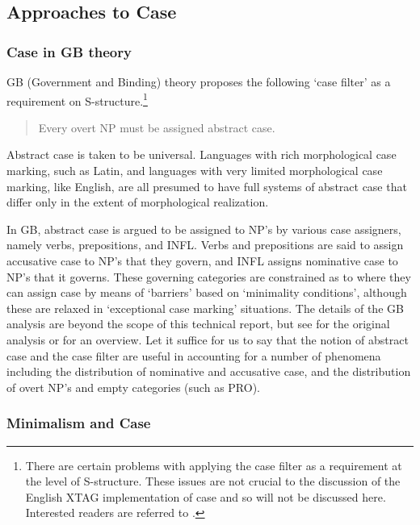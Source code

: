 \subsection{Approaches to Case}
\subsubsection{Case in GB theory}

GB (Government and Binding) theory proposes the following
`case filter' as a requirement on S-structure.\footnote{There are certain
problems with applying the case filter as a requirement at the level of
S-structure.  These issues are not crucial to the discussion of the English
XTAG implementation of case and so will not be discussed here.  Interested
readers are referred to
\cite{lasnik-uriagereka88}.}

\begin{verse}
Every overt NP must be assigned abstract case. \cite{haegeman91}
\end{verse}

Abstract case is taken to be universal.  Languages with rich morphological case
marking, such as Latin, and languages with very limited morphological case
marking, like English, are all presumed to have full systems of abstract case
that differ only in the extent of morphological realization.

In GB, abstract case is argued to be assigned to NP's by various case
assigners, namely verbs, prepositions, and INFL.  Verbs and
prepositions are said to assign accusative case to NP's that they
govern, and INFL assigns nominative case to NP's that it governs.
These governing categories are constrained as to where they can assign
case by means of `barriers' based on `minimality conditions', although
these are relaxed in `exceptional case marking' situations.  The
details of the GB analysis are beyond the scope of this technical
report, but see \cite{chomsky86} for the original analysis or
\cite{haegeman91} for an overview.  Let it suffice for us to say that
the notion of abstract case and the case filter are useful in
accounting for a number of phenomena including the distribution of
nominative and accusative case, and the distribution of overt NP's and
empty categories (such as PRO).

\subsubsection{Minimalism and Case} 

